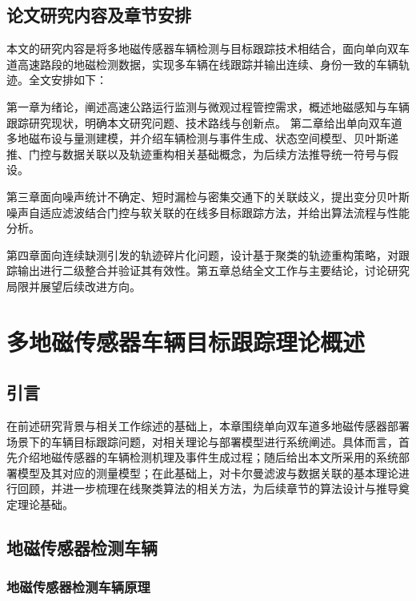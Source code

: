 \documentclass{xdupgthesis}
\begin{document}
\section{论文研究内容及章节安排}

本文的研究内容是将多地磁传感器车辆检测与目标跟踪技术相结合，面向单向双车道高速路段的地磁检测数据，实现多车辆在线跟踪并输出连续、身份一致的车辆轨迹。全文安排如下：

第一章为绪论，阐述高速公路运行监测与微观过程管控需求，概述地磁感知与车辆跟踪研究现状，明确本文研究问题、技术路线与创新点。
第二章给出单向双车道多地磁布设与量测建模，并介绍车辆检测与事件生成、状态空间模型、贝叶斯递推、门控与数据关联以及轨迹重构相关基础概念，为后续方法推导统一符号与假设。

第三章面向噪声统计不确定、短时漏检与密集交通下的关联歧义，提出变分贝叶斯噪声自适应滤波结合门控与软关联的在线多目标跟踪方法，并给出算法流程与性能分析。

第四章面向连续缺测引发的轨迹碎片化问题，设计基于聚类的轨迹重构策略，对跟踪输出进行二级整合并验证其有效性。第五章总结全文工作与主要结论，讨论研究局限并展望后续改进方向。





\chapter{多地磁传感器车辆目标跟踪理论概述}
\label{ch:ch2_event_detect}

\section{引言}\label{sec:ch2_intro}

在前述研究背景与相关工作综述的基础上，本章围绕单向双车道多地磁传感器部署场景下的车辆目标跟踪问题，对相关理论与部署模型进行系统阐述。具体而言，首先介绍地磁传感器的车辆检测机理及事件生成过程；随后给出本文所采用的系统部署模型及其对应的测量模型；在此基础上，对卡尔曼滤波与数据关联的基本理论进行回顾，并进一步梳理在线聚类算法的相关方法，为后续章节的算法设计与推导奠定理论基础。


\section{地磁传感器检测车辆}\label{sec:ch2_principle}

\subsection{地磁传感器检测车辆原理}\label{sec:ch2_basic}
\end{document}
